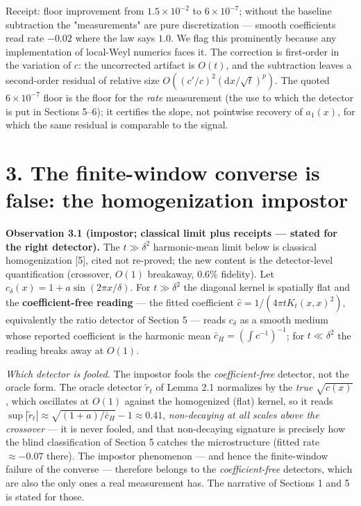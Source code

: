 \documentclass[11pt]{article}
\begin{document}
Receipt: floor improvement from $1.5\times 10^{-2}$ to $6\times 10^{-7}$; without the baseline subtraction the "measurements" are pure discretization — smooth coefficients read rate $-0.02$ where the law says $1.0$.  We flag this prominently because any implementation of local-Weyl numerics faces it.  The correction is first-order in the variation of $c$: the uncorrected artifact is $O(t)$, and the subtraction leaves a second-order residual of relative size $O((c'/c)^2(\mathrm{d}x/\sqrt t)^p)$.  The quoted $6\times 10^{-7}$ floor is the floor for the \emph{rate} measurement (the use to which the detector is put in Sections 5–6); it certifies the slope, not pointwise recovery of $a_1(x)$, for which the same residual is comparable to the signal.

\section*{3. The finite-window converse is false: the homogenization impostor}
\textbf{Observation 3.1 (impostor; classical limit plus receipts — stated for the right detector).}  The $t \gg \delta^2$ harmonic-mean limit below is classical homogenization [5], cited not re-proved; the new content is the detector-level quantification (crossover, $O(1)$ breakaway, $0.6\%$ fidelity).  Let $c_\delta(x) = 1 + a\sin(2\pi x/\delta)$.  For $t \gg \delta^2$ the diagonal kernel is spatially flat and the \textbf{coefficient-free reading} — the fitted coefficient $\hat c = 1/(4\pi t K_t(x,x)^2)$, equivalently the ratio detector of Section 5 — reads $c_\delta$ as a smooth medium whose reported coefficient is the harmonic mean $\bar c_H = (\int c^{-1})^{-1}$; for $t \ll \delta^2$ the reading breaks away at $O(1)$.

\emph{Which detector is fooled.}  The impostor fools the \emph{coefficient-free} detector, not the oracle form.  The oracle detector $\tilde r_t$ of Lemma 2.1 normalizes by the \emph{true} $\sqrt{c(x)}$, which oscillates at $O(1)$ against the homogenized (flat) kernel, so it reads $\sup|\tilde r_t| \approx \sqrt{(1+a)/\bar c_H} - 1 \approx 0.41$, \emph{non-decaying at all scales above the crossover} — it is never fooled, and that non-decaying signature is precisely how the blind classification of Section 5 catches the microstructure (fitted rate $\approx -0.07$ there).  The impostor phenomenon — and hence the finite-window failure of the converse — therefore belongs to the \emph{coefficient-free} detectors, which are also the only ones a real measurement has.  The narrative of Sections 1 and 5 is stated for those.
\end{document}
